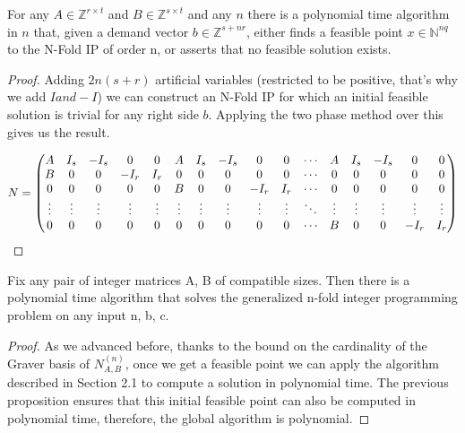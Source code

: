 \begin{proposition}
For any $A \in \mathbb{Z}^{r \times t}$ and $B \in \mathbb{Z}^{s \times t}$ and any $n$ there is a polynomial time algorithm in $n$ that, given a  demand vector $b \in \mathbb{Z}^{s + nr}$, either finds a feasible point $x \in \mathbb{N}^{nq}$ to the N-Fold IP of order n, or asserts that no feasible solution exists.
\end{proposition}
\vspace{-20pt}
\begin{proof}
Adding $2n(s+r)$ artificial variables (restricted to be positive, that's why we add $I and -I$) we can construct an N-Fold IP for which an initial feasible solution is trivial for any right side $b$. Applying the two phase method over this gives us the result. 

\begin{equation*}
N = 
\setcounter{MaxMatrixCols}{20}
\begin{pmatrix}
A & I_s & -I_s & 0 & 0 & A & I_s & -I_s & 0 & 0 & \cdots & A & I_s & -I_s & 0 & 0 \\
B & 0 & 0 & -I_r & I_r & 0 & 0 & 0 & 0 & 0 & \cdots & 0 & 0 & 0 & 0 & 0 \\
0 & 0 & 0 & 0 & 0 & B & 0 & 0 & -I_r & I_r & \cdots & 0 & 0 & 0 & 0 & 0 \\
\vdots & \vdots & \vdots & \vdots & \vdots & \vdots & \vdots & \vdots & \vdots & \vdots & \ddots & \vdots & \vdots  & \vdots & \vdots & \vdots \\
0 & 0 & 0 & 0 & 0 & 0 & 0 & 0 & 0 & 0 & \cdots & B & 0 & 0 & -I_r & I_r 
\end{pmatrix}
\end{equation*}

\end{proof}

\begin{theorem}
Fix any pair of integer matrices A, B of compatible sizes. Then there is a polynomial time algorithm that solves the generalized n-fold integer programming problem on any input n, b, c.
\end{theorem}
\vspace{-20pt}
\begin{proof}
As we advanced before, thanks to the bound on the cardinality of the  Graver basis of $N_{A,B}^{(n)}$, once we get a feasible point we can apply the algorithm described in Section 2.1 to compute a solution in polynomial time. The previous proposition ensures that this initial feasible point can also be computed in polynomial time, therefore, the global algorithm is polynomial.
\end{proof}

